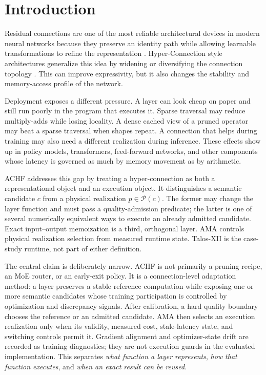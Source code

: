 \documentclass{article}
\newcommand{\achf}{\textsc{ACHF}}
\newcommand{\ama}{\textsc{AMA}}
\begin{document}
\section{Introduction}

Residual connections are one of the most reliable architectural devices in
modern neural networks because they preserve an identity path while allowing
learnable transformations to refine the representation
\cite{he2016deep,he2016identity}. Hyper-Connection style architectures
generalize this idea by widening or diversifying the connection topology
\cite{hyperconnections2024,mhc2025}. This can improve expressivity, but it also
changes the stability and memory-access profile of the network.

Deployment exposes a different pressure. A layer can look cheap on paper and
still run poorly in the program that executes it. Sparse traversal may reduce
multiply-adds while losing locality. A dense cached view of a pruned operator
may beat a sparse traversal when shapes repeat. A connection that helps during
training may also need a different realization during inference. These effects
show up in policy models, transformers, feed-forward networks, and other
components whose latency is governed as much by memory movement as by
arithmetic.

\achf{} addresses this gap by treating a hyper-connection as both a
representational object and an execution object. It distinguishes a semantic
candidate $c$ from a physical realization $p\in\mathcal{P}(c)$. The former may
change the layer function and must pass a quality-admission predicate; the
latter is one of several numerically equivalent ways to execute an already
admitted candidate. Exact input--output memoization is a third, orthogonal
layer. \ama{} controls physical realization selection from measured runtime
state. Talos-XII is the case-study runtime, not part of either definition.

The central claim is deliberately narrow. \achf{} is not primarily a pruning
recipe, an MoE router, or an early-exit policy. It is a connection-level
adaptation method: a layer preserves a stable reference computation while
exposing one or more semantic candidates whose training participation is
controlled by optimization and discrepancy signals. After calibration, a hard
quality boundary chooses the reference or an admitted candidate. \ama{} then
selects an execution realization only when its validity, measured cost,
stale-latency state, and switching controls permit it. Gradient alignment and
optimizer-state drift are recorded as training diagnostics; they are not
execution guards in the evaluated implementation. This separates \emph{what
function a layer represents}, \emph{how that function executes}, and \emph{when
an exact result can be reused}.
\end{document}
